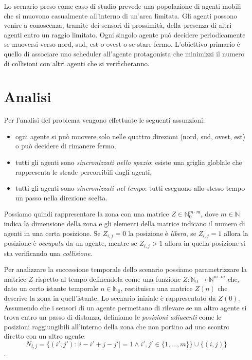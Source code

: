 

Lo scenario preso come caso di studio prevede una popolazione di agenti mobili che si muovono casualmente all'interno di un'area limitata. Gli agenti possono venire a conoscenza, tramite dei sensori di prossimità, della presenza di altri agenti entro un raggio limitato.
Ogni singolo agente può decidere periodicamente se muoversi verso nord, sud, est o ovest o se stare fermo.
L’obiettivo primario è quello di associare uno scheduler all'agente protagonista che minimizzi il numero di collisioni con altri agenti che si verificheranno.

\section{Analisi}
Per l’analisi del problema vengono effettuate le seguenti assunzioni:
\begin{itemize}
	\item ogni agente si può muovere solo nelle quattro direzioni (nord, sud, ovest, est) o può decidere di rimanere fermo,
	\item tutti gli agenti sono \emph{sincronizzati nello spazio}: esiste una griglia globlale che rappresenta le strade percorribili dagli agenti,
	\item tutti gli agenti sono \emph{sincronizzati nel tempo}: tutti eseguono allo stesso tempo un passo nella direzione scelta.
\end{itemize}

Possiamo quindi rappresentare la zona con una matrice $Z \in \mathbb{N}_0^{m\cdot m}$, dove $m \in \mathbb{N}$ indica la dimensione della zona e gli elementi della matrice indicano il numero di agenti in una certa posizione. Se $Z_{i,j}=0$ la posizione è \emph{libera}, se $Z_{i,j}=1$  allora la posizione è \emph{occupata} da un agente, mentre se $Z_{i,j}>1$ allora in quella posizione si sta verificando una \emph{collisione}.

Per analizzare la successione temporale dello scenario possiamo parametrizzare la matrice $Z$ rispetto al tempo definendola come una funzione $Z:\mathbb{N}_0 \rightarrow \mathbb{N}^{m\cdot m}$ che, dato un certo istante temporale $n \in \mathbb{N}_0$, restituisce una matrice $Z(n)$ che descrive la zona in quell’istante. Lo scenario iniziale è rappresentato da $Z(0)$.
Assumendo che i sensori di un agente permettano di rilevare se un altro agente si trova entro un passo di distanza, definiamo le \emph{posizioni adiacenti} come le posizioni raggiungibili all’interno della zona che non portino ad uno scontro diretto con un altro agente:
$$ N_{i,j} = \{(i',j') : |i-i'+j-j'| = 1 \wedge i',j' \in \{1,\dots,m\}\} \cup \{(i,j)\} $$.

